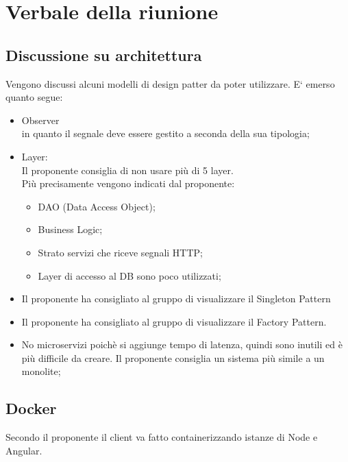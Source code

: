 \section{Verbale della riunione}

\subsection{Discussione su architettura}
Vengono discussi alcuni modelli di design patter da poter utilizzare. E` emerso quanto segue:
\begin{itemize}
\item Observer\\in quanto il segnale deve essere gestito a seconda della sua tipologia;
\item Layer: 
\\Il proponente consiglia di non usare più di 5 layer.\\Più precisamente vengono indicati dal proponente:
	\begin{itemize}
	\item DAO (Data Access Object);
	\item Business Logic;
	\item Strato servizi che riceve segnali HTTP;
	\item Layer di accesso al DB sono poco utilizzati;
	\end{itemize}
\item Il proponente ha consigliato al gruppo di visualizzare il Singleton Pattern
\item Il proponente ha consigliato al gruppo di visualizzare il Factory Pattern.
\item No microservizi poichè si aggiunge tempo di latenza, quindi sono inutili ed è più difficile da creare. Il proponente consiglia un sistema più simile a un monolite;
\end{itemize}

\subsection{Docker}
Secondo il proponente il client va fatto containerizzando istanze di Node e Angular. 

